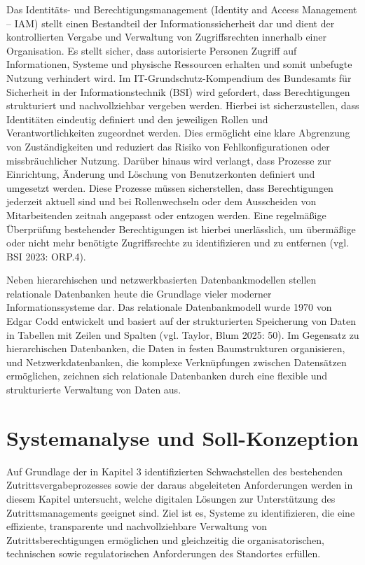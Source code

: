\documentclass[
  12pt,
  a4paper,
  oneside,
  headings=normal,
  numbers=noendperiod
]{scrreprt}
\numberwithin{equation}{chapter}
\begin{document}
Das Identitäts- und Berechtigungsmanagement (Identity and Access Management --
IAM) stellt einen Bestandteil der Informationssicherheit dar und dient der
kontrollierten Vergabe und Verwaltung von Zugriffsrechten innerhalb einer
Organisation. Es stellt sicher, dass autorisierte Personen Zugriff auf
Informationen, Systeme und physische Ressourcen erhalten und somit unbefugte
Nutzung verhindert wird. Im IT-Grundschutz-Kompendium des Bundesamts für
Sicherheit in der Informationstechnik (BSI) wird gefordert, dass Berechtigungen
strukturiert und nachvollziehbar vergeben werden. Hierbei ist sicherzustellen,
dass Identitäten eindeutig definiert und den jeweiligen Rollen und
Verantwortlichkeiten zugeordnet werden. Dies ermöglicht eine klare Abgrenzung
von Zuständigkeiten und reduziert das Risiko von Fehlkonfigurationen oder
missbräuchlicher Nutzung. Darüber hinaus wird verlangt, dass Prozesse zur
Einrichtung, Änderung und Löschung von Benutzerkonten definiert und umgesetzt
werden. Diese Prozesse müssen sicherstellen, dass Berechtigungen jederzeit
aktuell sind und bei Rollenwechseln oder dem Ausscheiden von Mitarbeitenden
zeitnah angepasst oder entzogen werden. Eine regelmäßige Überprüfung bestehender
Berechtigungen ist hierbei unerlässlich, um übermäßige oder nicht mehr benötigte
Zugriffsrechte zu identifizieren und zu entfernen (vgl. BSI 2023: ORP.4).

Neben hierarchischen und netzwerkbasierten Datenbankmodellen stellen relationale
Datenbanken heute die Grundlage vieler moderner Informationssysteme dar. Das
relationale Datenbankmodell wurde 1970 von Edgar Codd entwickelt und basiert auf
der strukturierten Speicherung von Daten in Tabellen mit Zeilen und Spalten
(vgl. Taylor, Blum 2025: 50). Im Gegensatz zu hierarchischen Datenbanken, die
Daten in festen Baumstrukturen organisieren, und Netzwerkdatenbanken, die
komplexe Verknüpfungen zwischen Datensätzen ermöglichen, zeichnen sich
relationale Datenbanken durch eine flexible und strukturierte Verwaltung von
Daten aus.

\clearpage

\label{test:nested-chapter}
\setcounter{chapter}{3}
\chapter{Systemanalyse und Soll-Konzeption}

Auf Grundlage der in Kapitel 3 identifizierten Schwachstellen des bestehenden
Zutrittsvergabeprozesses sowie der daraus abgeleiteten Anforderungen werden in
diesem Kapitel untersucht, welche digitalen Lösungen zur Unterstützung des
Zutrittsmanagements geeignet sind. Ziel ist es, Systeme zu identifizieren, die
eine effiziente, transparente und nachvollziehbare Verwaltung von
Zutrittsberechtigungen ermöglichen und gleichzeitig die organisatorischen,
technischen sowie regulatorischen Anforderungen des Standortes erfüllen.
\end{document}
